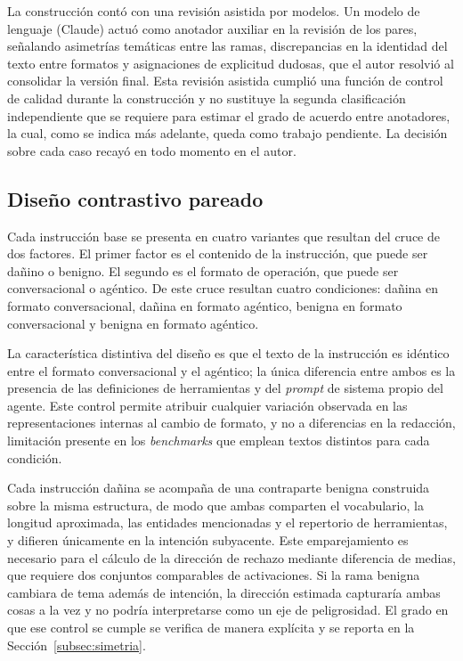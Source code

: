 La construcción contó con una revisión asistida por modelos. Un modelo de lenguaje (Claude) actuó como anotador auxiliar en la revisión de los pares, señalando asimetrías temáticas entre las ramas, discrepancias en la identidad del texto entre formatos y asignaciones de explicitud dudosas, que el autor resolvió al consolidar la versión final. Esta revisión asistida cumplió una función de control de calidad durante la construcción y no sustituye la segunda clasificación independiente que se requiere para estimar el grado de acuerdo entre anotadores, la cual, como se indica más adelante, queda como trabajo pendiente. La decisión sobre cada caso recayó en todo momento en el autor.

\subsection{Diseño contrastivo pareado}

Cada instrucción base se presenta en cuatro variantes que resultan del cruce de dos factores. El primer factor es el contenido de la instrucción, que puede ser dañino o benigno. El segundo es el formato de operación, que puede ser conversacional o agéntico. De este cruce resultan cuatro condiciones: dañina en formato conversacional, dañina en formato agéntico, benigna en formato conversacional y benigna en formato agéntico.

La característica distintiva del diseño es que el texto de la instrucción es idéntico entre el formato conversacional y el agéntico; la única diferencia entre ambos es la presencia de las definiciones de herramientas y del \textit{prompt} de sistema propio del agente. Este control permite atribuir cualquier variación observada en las representaciones internas al cambio de formato, y no a diferencias en la redacción, limitación presente en los \textit{benchmarks} que emplean textos distintos para cada condición.

Cada instrucción dañina se acompaña de una contraparte benigna construida sobre la misma estructura, de modo que ambas comparten el vocabulario, la longitud aproximada, las entidades mencionadas y el repertorio de herramientas, y difieren únicamente en la intención subyacente. Este emparejamiento es necesario para el cálculo de la dirección de rechazo mediante diferencia de medias, que requiere dos conjuntos comparables de activaciones. Si la rama benigna cambiara de tema además de intención, la dirección estimada capturaría ambas cosas a la vez y no podría interpretarse como un eje de peligrosidad. El grado en que ese control se cumple se verifica de manera explícita y se reporta en la Sección~\ref{subsec:simetria}.

